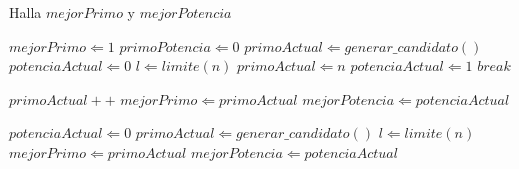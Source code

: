 \begin{algorithm}
\caption{Halla $mejorPrimo$ y $mejorPotencia$}
\begin{algorithmic}[1]
\STATE $mejorPrimo \Leftarrow 1$
\STATE $primoPotencia \Leftarrow 0$
\STATE $primoActual \Leftarrow generar\_candidato()$
\STATE $potenciaActual \Leftarrow 0$
\STATE $l \Leftarrow limite(n)$
        \STATE $primoActual \Leftarrow n$
        \STATE $potenciaActual \Leftarrow 1$
        \STATE $break$
    \ENDIF

        \STATE $primoActual++$
    \ELSE
            \STATE $mejorPrimo \Leftarrow primoActual$
            \STATE $mejorPotencia \Leftarrow potenciaActual$
        \ENDIF

        \STATE $potenciaActual \Leftarrow 0$
        \STATE $primoActual \Leftarrow generar\_candidato()$
        \STATE $l \Leftarrow limite(n)$
    \ENDIF
\ENDWHILE
{}
    \STATE $mejorPrimo \Leftarrow primoActual$
    \STATE $mejorPotencia \Leftarrow potenciaActual$
\ENDIF
\end{algorithmic}
\end{algorithm}
